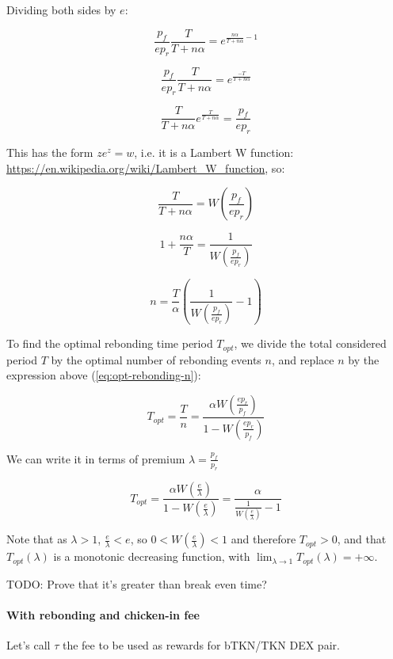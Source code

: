 \documentclass{article}
\begin{document}
Dividing both sides by $e$:

\[
\frac{p_f}{e p_r} \frac{T}{T+n\alpha} = e^{\frac{n\alpha}{T+n\alpha} - 1}
\]

\[
\frac{p_f}{e p_r} \frac{T}{T+n\alpha} = e^{\frac{-T}{T+n\alpha}}
\]

\[
\frac{T}{T+n\alpha} e^{\frac{T}{T+n\alpha}} = \frac{p_f}{e p_r} 
\]

This has the form $z e^z = w$, i.e. it is a Lambert W function: \url{https://en.wikipedia.org/wiki/Lambert_W_function}, so:

\[
\frac{T}{T+n\alpha} = W\left(\frac{p_f}{e p_r} \right)
\]

\[
1 + \frac{n\alpha}{T} = \frac{1}{W\left(\frac{p_f}{e p_r} \right)}
\]

\begin{equation}
  \label{eq:opt-rebonding-n}
n = \frac{T}{\alpha} \left(\frac{1}{W\left(\frac{p_f}{e p_r} \right)} - 1\right)
\end{equation}

To find the optimal rebonding time period $T_{opt}$, we divide the total considered period $T$ by the optimal number of rebonding events $n$, and replace $n$ by the expression above (\ref{eq:opt-rebonding-n}):

\begin{equation}
  \label{eq:opt-rebonding-prices}
T_{opt} = \frac{T}{n} = \frac{\alpha W\left(\frac{e p_r}{p_f}\right)}{1 - W\left(\frac{e p_r}{p_f}\right)}
\end{equation}

We can write it in terms of premium $\lambda = \frac{p_f}{p_r}$

\begin{equation}
  \label{eq:opt-rebonding-premium}
T_{opt} = \frac{\alpha W\left(\frac{e}{\lambda}\right)}{1 - W\left(\frac{e}{\lambda}\right)} = \frac{\alpha}{\frac{1}{W\left(\frac{e}{\lambda}\right)} - 1}
\end{equation}

Note that as $\lambda > 1$, $\frac{e}{\lambda} < e$, so $0 < W(\frac{e}{\lambda}) < 1$ and therefore $T_{opt} > 0$, and that $T_{opt}(\lambda)$ is a monotonic decreasing function, with $\lim_{\lambda \rightarrow 1}T_{opt}(\lambda) = +\infty$.


TODO: Prove that it’s greater than break even time?

\paragraph{With rebonding and chicken-in fee}
Let’s call $\tau$ the fee to be used as rewards for bTKN/TKN DEX pair.
\end{document}
